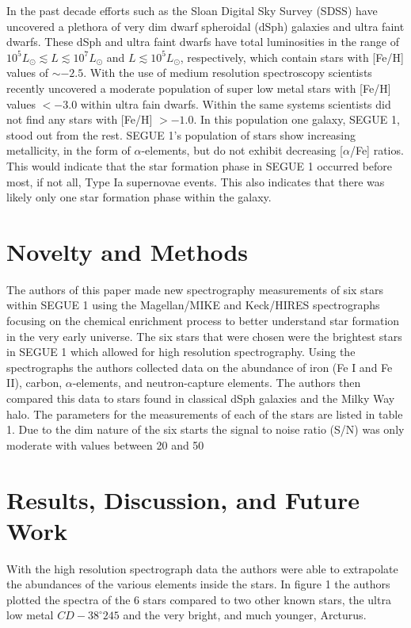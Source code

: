 \documentclass{aastex631}
\begin{document}
In the past decade efforts such as the Sloan Digital Sky Survey (SDSS) have uncovered a plethora of very dim dwarf spheroidal
(dSph) galaxies and ultra faint dwarfs. These dSph and ultra faint dwarfs have total luminosities in the range of
\(10^{5} L_{\odot} \lesssim L \lesssim 10^{7} L_{\odot}\) and \(L \lesssim 10^5 L_{\odot}\), respectively, which contain
stars with [Fe/H] values of $\sim -2.5$. With the use of medium resolution spectroscopy scientists recently uncovered a
moderate population of super low metal stars with [Fe/H] values $< -3.0$ within ultra fain dwarfs. Within the same systems
scientists did not find any stars with [Fe/H] $> -1.0$. In this population one galaxy, SEGUE 1, stood out from the rest. 
SEGUE 1's population of stars show increasing metallicity, in the form of $\alpha$-elements, but do not exhibit decreasing
[$\alpha$/Fe] ratios. 
This would indicate that the star formation phase in SEGUE 1 occurred before most, if not all, Type Ia supernovae events. This
also indicates that there was likely only one star formation phase within the galaxy.

\section{Novelty and Methods} \label{sec:novelty}

The authors of this paper made new spectrography measurements of six stars within SEGUE 1 using the Magellan/MIKE and Keck/HIRES
spectrographs focusing on the chemical enrichment process to better understand star formation in the very early universe. The six
stars that were chosen were the brightest stars in SEGUE 1 which allowed for high resolution spectrography. Using the spectrographs
the authors collected data on the abundance of iron (Fe I and Fe II), carbon, $\alpha$-elements, and neutron-capture elements. The authors then compared this data to stars found in classical dSph galaxies and the Milky Way halo.
The parameters for the measurements of each of the stars are listed in table 1. Due to the dim nature of the six starts the signal to
noise ratio (S/N) was only moderate with values between 20 and 50

\section{Results, Discussion, and Future Work} \label{sec:dicussion}

With the high resolution spectrograph data the authors were able to extrapolate the abundances of the various elements inside the stars.
In figure 1 the authors plotted the spectra of the 6 stars compared to two other known stars, the ultra low metal $CD -38^{\circ}245$
and the very bright, and much younger, Arcturus.
\end{document}

